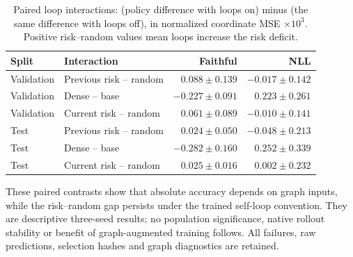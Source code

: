 \begin{table}[ht]
\centering\small
\caption{Paired loop interactions: (policy difference with loops on) minus
(the same difference with loops off), in normalized coordinate MSE $\times10^3$.
Positive risk--random values mean loops increase the risk deficit.}
\label{tab:graph-loop-interactions}
\begin{tabular}{llrr}
\toprule
Split & Interaction & Faithful & NLL\\
\midrule
Validation & Previous risk -- random & $0.088\pm0.139$ & $-0.017\pm0.142$\\
Validation & Dense -- base & $-0.227\pm0.091$ & $0.223\pm0.261$\\
Validation & Current risk -- random & $0.061\pm0.089$ & $-0.010\pm0.141$\\
Test & Previous risk -- random & $0.024\pm0.050$ & $-0.048\pm0.213$\\
Test & Dense -- base & $-0.282\pm0.160$ & $0.252\pm0.339$\\
Test & Current risk -- random & $0.025\pm0.016$ & $0.002\pm0.232$\\
\bottomrule
\end{tabular}
\end{table}

These paired contrasts show that absolute accuracy depends on graph inputs,
while the risk--random gap persists under the trained self-loop convention.
They are descriptive three-seed results; no population significance, native
rollout stability or benefit of graph-augmented training follows. All failures,
raw predictions, selection hashes and graph diagnostics are retained.
